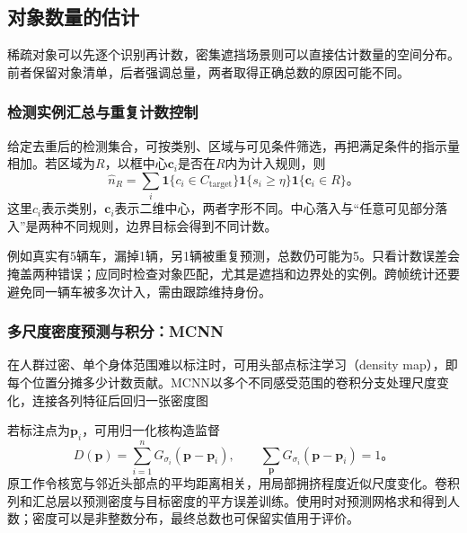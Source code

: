 \subsection{对象数量的估计}
\label{sec:vision-recognition-counting}

稀疏对象可以先逐个识别再计数，密集遮挡场景则可以直接估计数量的空间分布。前者保留对象清单，后者强调总量，两者取得正确总数的原因可能不同。

\subsubsection{检测实例汇总与重复计数控制}
\label{sec:vision-recognition-instance-counting}

给定去重后的检测集合，可按类别、区域与可见条件筛选，再把满足条件的指示量相加。若区域为$R$，以框中心$\bm{c}_i$是否在$R$内为计入规则，则
\begin{equation}
 \hat n_R=\sum_i
 \mathbf{1}\{c_i\in C_{\mathrm{target}}\}
 \mathbf{1}\{s_i\geq\eta\}
 \mathbf{1}\{\bm{c}_i\in R\}\text{。}
 \label{eq:vision-detection-count}
\end{equation}
这里$c_i$表示类别，$\bm{c}_i$表示二维中心，两者字形不同。中心落入与“任意可见部分落入”是两种不同规则，边界目标会得到不同计数。

例如真实有5辆车，漏掉1辆，另1辆被重复预测，总数仍可能为5。只看计数误差会掩盖两种错误；应同时检查对象匹配，尤其是遮挡和边界处的实例。跨帧统计还要避免同一辆车被多次计入，需由跟踪维持身份。

\subsubsection{多尺度密度预测与积分：MCNN}
\label{sec:vision-recognition-mcnn}

在人群过密、单个身体范围难以标注时，可用头部点标注学习（density map），即每个位置分摊多少计数贡献。MCNN以多个不同感受范围的卷积分支处理尺度变化，连接各列特征后回归一张密度图

若标注点为$\bm{p}_i$，可用归一化核构造监督
\begin{equation}
 D(\bm{p})=\sum_{i=1}^{n}G_{\sigma_i}(\bm{p}-\bm{p}_i),
 \qquad
 \sum_{\bm{p}}G_{\sigma_i}(\bm{p}-\bm{p}_i)=1\text{。}
 \label{eq:vision-density-target}
\end{equation}
原工作令核宽与邻近头部点的平均距离相关，用局部拥挤程度近似尺度变化。卷积列和汇总层以预测密度与目标密度的平方误差训练。使用时对预测网格求和得到人数；密度可以是非整数分布，最终总数也可保留实值用于评价。

